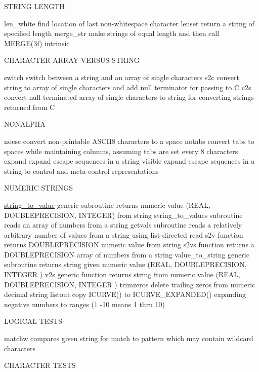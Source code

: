 S\+T\+R\+I\+NG L\+E\+N\+G\+TH

len\+\_\+white find location of last non-\/whitespace character lenset return a string of specified length merge\+\_\+str make strings of equal length and then call M\+E\+R\+G\+E(3f) intrinsic

C\+H\+A\+R\+A\+C\+T\+ER A\+R\+R\+AY V\+E\+R\+S\+US S\+T\+R\+I\+NG

switch switch between a string and an array of single characters s2c convert string to array of single characters and add null terminator for passing to C c2s convert null-\/terminated array of single characters to string for converting strings returned from C

N\+O\+N\+A\+L\+P\+HA

noesc convert non-\/printable A\+S\+C\+I\+I8 characters to a space notabs convert tabs to spaces while maintaining columns, assuming tabs are set every 8 characters expand expand escape sequences in a string visible expand escape sequences in a string to control and meta-\/control representations

N\+U\+M\+E\+R\+IC S\+T\+R\+I\+N\+GS

\hyperlink{interfacem__strings_1_1string__to__value}{string\+\_\+to\+\_\+value} generic subroutine returns numeric value (R\+E\+AL, D\+O\+U\+B\+L\+E\+P\+R\+E\+C\+I\+S\+I\+ON, I\+N\+T\+E\+G\+ER) from string string\+\_\+to\+\_\+values subroutine reads an array of numbers from a string getvals subroutine reads a relatively arbitrary number of values from a string using list-\/directed read s2v function returns D\+O\+U\+B\+L\+E\+P\+R\+E\+C\+I\+S\+I\+ON numeric value from string s2vs function returns a D\+O\+U\+B\+L\+E\+P\+R\+E\+C\+I\+S\+I\+ON array of numbers from a string value\+\_\+to\+\_\+string generic subroutine returns string given numeric value (R\+E\+AL, D\+O\+U\+B\+L\+E\+P\+R\+E\+C\+I\+S\+I\+ON, I\+N\+T\+E\+G\+ER ) \hyperlink{interfacem__strings_1_1v2s}{v2s} generic function returns string from numeric value (R\+E\+AL, D\+O\+U\+B\+L\+E\+P\+R\+E\+C\+I\+S\+I\+ON, I\+N\+T\+E\+G\+ER ) trimzeros delete trailing zeros from numeric decimal string listout copy I\+C\+U\+R\+V\+E() to I\+C\+U\+R\+V\+E\+\_\+\+E\+X\+P\+A\+N\+D\+E\+D() expanding negative numbers to ranges (1 -\/10 means 1 thru 10)

L\+O\+G\+I\+C\+AL T\+E\+S\+TS

matchw compares given string for match to pattern which may contain wildcard characters

C\+H\+A\+R\+A\+C\+T\+ER T\+E\+S\+TS

